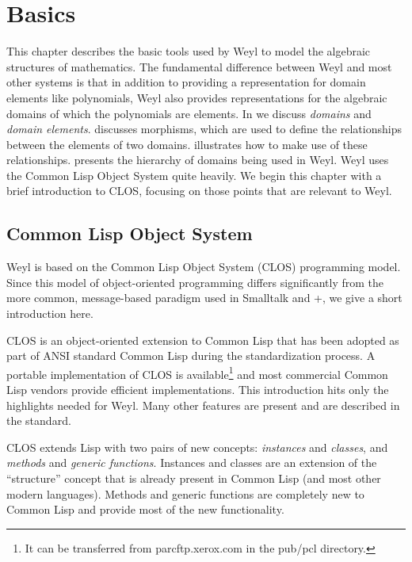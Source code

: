 \chapter{Basics}
\label{Basics:Chap}

This chapter describes the basic tools used by Weyl to model the
algebraic structures of mathematics.  The fundamental difference
between Weyl and most other systems is that in addition to providing a
representation for domain elements like polynomials, Weyl also
provides representations for the algebraic domains of which the
polynomials are elements.  In  we discuss {\em
domains} and {\em domain elements}.  discusses
morphisms, which are used to define the relationships between the
elements of two domains.   illustrates how to
make use of these relationships.  
presents the hierarchy of domains being used in Weyl. Weyl uses the
Common Lisp Object System quite heavily. We begin this chapter with a
brief introduction to CLOS, focusing on those points that are
relevant to Weyl.

\section{Common Lisp Object System}
\label{CLOS:Sec}

Weyl is based on the Common Lisp Object System (CLOS) \cite{CLOS:Manual}
programming model.  Since this model of object-oriented programming
differs significantly from the more common, message-based paradigm
used in Smalltalk and \Cp+, we give a short introduction here.

CLOS is an object-oriented extension to Common Lisp that has been
adopted as part of ANSI standard Common Lisp during the
standardization process.  A portable implementation of CLOS is
available\footnote{It can be transferred from {\sf parcftp.xerox.com}
in the {\sf pub/pcl} directory.} and most commercial Common Lisp
vendors provide efficient implementations.  This introduction hits
only the highlights needed for Weyl.  Many other features are present
and are described in the standard.

CLOS extends Lisp with two pairs of new concepts: {\em instances} and
{\em classes\/}, and {\em methods} and {\em generic functions\/}.
Instances and classes are an extension of the ``structure'' concept
that is already present in Common Lisp (and most other modern
languages).  Methods and generic functions are completely new to
Common Lisp and provide most of the new functionality.

